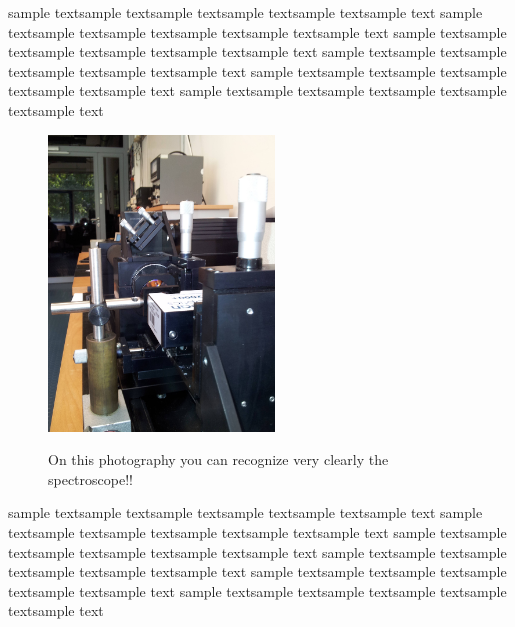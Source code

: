 sample textsample textsample textsample textsample textsample text
sample textsample textsample textsample textsample textsample text
sample textsample textsample textsample textsample textsample text
sample textsample textsample textsample textsample textsample text
sample textsample textsample textsample textsample textsample text
sample textsample textsample textsample textsample textsample text
\begin{figure} 
\caption{On this photography you can recognize very 
    clearly the spectroscope!!} 
\includegraphics[width=6cm]{pics/const3}
 \label{fig:const3}
\end{figure}
sample textsample textsample textsample textsample textsample text
sample textsample textsample textsample textsample textsample text
sample textsample textsample textsample textsample textsample text
sample textsample textsample textsample textsample textsample text
sample textsample textsample textsample textsample textsample text
sample textsample textsample textsample textsample textsample text
